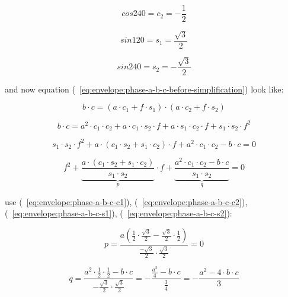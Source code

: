 \documentclass[unicode, 12pt, a4paper]{article}
\begin{document}
\begin{equation}
  \label{eq:envelope:phase-a-b-c-c2}
  cos 240 = c_2 = -\frac{1}{2}
\end{equation}

\begin{equation}
  \label{eq:envelope:phase-a-b-c-s1}
  sin 120 = s_1 = \frac{\sqrt{3}}{2}
\end{equation}

\begin{equation}
  \label{eq:envelope:phase-a-b-c-s2}
  sin 240 = s_2 = -\frac{\sqrt{3}}{2}
\end{equation}

and now equation
(~\ref{eq:envelope:phase-a-b-c-before-simplification}) look like:

\begin{equation}
  b \cdot c = (a \cdot c_1 + f \cdot s_1) \cdot (a \cdot c_2 + f \cdot s_2)
\end{equation}

\begin{equation}
  b \cdot c =
  a^2 \cdot c_1 \cdot c_2 +
  a \cdot c_1 \cdot s_2 \cdot f +
  a \cdot s_1 \cdot c_2 \cdot f +
  s_1 \cdot s_2 \cdot f^2
\end{equation}

\begin{equation}
  s_1 \cdot s_2 \cdot f^2 +
  a \cdot (c_1 \cdot s_2 + s_1 \cdot c_2) \cdot f +
  a^2 \cdot c_1 \cdot c_2 - b \cdot c =
  0
\end{equation}

\begin{equation}
  f^2 +
  \underbrace{\frac{a \cdot (c_1 \cdot s_2 + s_1 \cdot c_2)}{s_1 \cdot s_2}}_{p} \cdot f +
  \underbrace{\frac{a^2 \cdot c_1 \cdot c_2 - b \cdot c}{s_1 \cdot s_2}}_{q} =
  0
\end{equation}

use
(~\ref{eq:envelope:phase-a-b-c-c1}),
(~\ref{eq:envelope:phase-a-b-c-c2}),
(~\ref{eq:envelope:phase-a-b-c-s1}),
(~\ref{eq:envelope:phase-a-b-c-s2}):

\begin{equation}
  p = \frac{a \left(\frac{1}{2} \cdot \frac{\sqrt{3}}{2} - \frac{\sqrt{3}}{2} \cdot \frac{1}{2} \right)}
    {\frac{-\sqrt{3}}{2} \cdot \frac{\sqrt{3}}{2}} =
    0
\end{equation}

\begin{equation}
  q =
  \frac{a^2 \cdot \frac{1}{2} \cdot \frac{1}{2} - b \cdot c}
  {-\frac{\sqrt{3}}{2} \cdot \frac{\sqrt{3}}{2}} =
  -\frac{\frac{a^2}{4} - b \cdot c}
  {\frac{3}{4}} =
  -\frac{a^2 - 4 \cdot b \cdot c}{3}
\end{equation}
\end{document}
